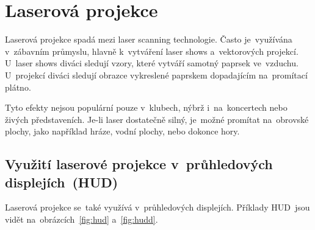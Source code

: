 \chapter{Laserová projekce}
Laserová projekce spadá mezi laser scanning technologie. Často je~využívána v~zábavním průmyslu, hlavně k~vytváření laser shows a~vektorových projekcí. U~laser shows diváci sledují vzory, které vytváří samotný paprsek ve~vzduchu. U~projekcí diváci sledují obrazce vykreslené paprskem dopadajícím na~promítací plátno.~\cite{laser-projection}

Tyto efekty nejsou populární pouze v~klubech, nýbrž i~na~koncertech nebo živých představeních. Je-li laser dostatečně silný, je~možné promítat na~obrovské plochy, jako například hráze, vodní plochy, nebo dokonce hory.~\cite{laser-projection} 

\section{Využití laserové projekce v~průhledových displejích~(HUD)}
Laserová projekce se~také využívá v~průhledových displejích. Příklady HUD~jsou vidět na~obrázcích~\ref{fig:hud} a~\ref{fig:hudd}.


